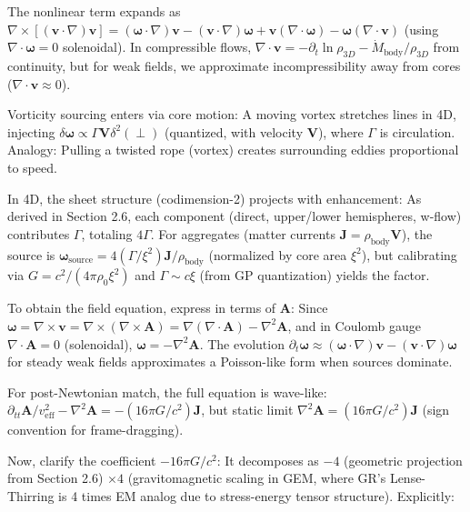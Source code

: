 The nonlinear term expands as $\nabla \times [(\mathbf{v} \cdot \nabla) \mathbf{v}] = (\boldsymbol{\omega} \cdot \nabla) \mathbf{v} - (\mathbf{v} \cdot \nabla) \boldsymbol{\omega} + \mathbf{v} (\nabla \cdot \boldsymbol{\omega}) - \boldsymbol{\omega} (\nabla \cdot \mathbf{v})$ (using $\nabla \cdot \boldsymbol{\omega} = 0$ solenoidal). In compressible flows, $\nabla \cdot \mathbf{v} = - \partial_t \ln \rho_{3D} - \dot{M}_{\text{body}} / \rho_{3D}$ from continuity, but for weak fields, we approximate incompressibility away from cores ($\nabla \cdot \mathbf{v} \approx 0$).

Vorticity sourcing enters via core motion: A moving vortex stretches lines in 4D, injecting $\delta \boldsymbol{\omega} \propto \Gamma \mathbf{V} \delta^2(\perp)$ (quantized, with velocity $\mathbf{V}$), where $\Gamma$ is circulation. Analogy: Pulling a twisted rope (vortex) creates surrounding eddies proportional to speed.

In 4D, the sheet structure (codimension-2) projects with enhancement: As derived in Section 2.6, each component (direct, upper/lower hemispheres, w-flow) contributes $\Gamma$, totaling $4\Gamma$. For aggregates (matter currents $\mathbf{J} = \rho_{\text{body}} \mathbf{V}$), the source is $\boldsymbol{\omega}_{\text{source}} = 4 (\Gamma / \xi^2) \mathbf{J} / \rho_{\text{body}}$ (normalized by core area $\xi^2$), but calibrating via $G = c^2 / (4\pi \rho_0 \xi^2)$ and $\Gamma \sim c \xi$ (from GP quantization) yields the factor.

To obtain the field equation, express in terms of $\mathbf{A}$: Since $\boldsymbol{\omega} = \nabla \times \mathbf{v} = \nabla \times (\nabla \times \mathbf{A}) = \nabla (\nabla \cdot \mathbf{A}) - \nabla^2 \mathbf{A}$, and in Coulomb gauge $\nabla \cdot \mathbf{A} = 0$ (solenoidal), $\boldsymbol{\omega} = - \nabla^2 \mathbf{A}$. The evolution $\partial_t \boldsymbol{\omega} \approx (\boldsymbol{\omega} \cdot \nabla) \mathbf{v} - (\mathbf{v} \cdot \nabla) \boldsymbol{\omega}$ for steady weak fields approximates a Poisson-like form when sources dominate.

For post-Newtonian match, the full equation is wave-like: $\partial_{tt} \mathbf{A} / v_{\text{eff}}^2 - \nabla^2 \mathbf{A} = - (16\pi G / c^2) \mathbf{J}$, but static limit $\nabla^2 \mathbf{A} = (16\pi G / c^2) \mathbf{J}$ (sign convention for frame-dragging).

Now, clarify the coefficient $-16\pi G / c^2$: It decomposes as $-4$ (geometric projection from Section 2.6) $\times 4$ (gravitomagnetic scaling in GEM, where GR's Lense-Thirring is 4 times EM analog due to stress-energy tensor structure). Explicitly:

